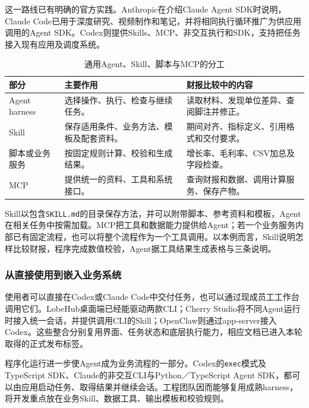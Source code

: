 这一路线已有明确的官方实践。Anthropic在介绍Claude Agent SDK时说明，Claude Code已用于深度研究、视频制作和笔记，并将相同执行循环推广为供应用调用的Agent SDK。Codex则提供Skills、MCP、非交互执行和SDK，支持把任务接入现有应用及调度系统。

\begin{table}[H]\small\centering
\caption{通用Agent、Skill、脚本与MCP的分工}\label{tab:skills-mcp}
\begin{tabularx}{\linewidth}{@{}P{28mm}Y Y@{}}\toprule
部分 & 主要作用 & 财报比较中的内容\\\midrule
Agent harness & 选择操作、执行、检查与继续任务。 & 读取材料、发现单位差异、查阅脚注并修正。\\
Skill & 保存适用条件、业务方法、模板及配套资料。 & 期间对齐、指标定义、引用格式和交付要求。\\
脚本或业务服务 & 按固定规则计算、校验和生成结果。 & 增长率、毛利率、CSV加总及字段检查。\\
MCP & 提供统一的资料、工具和系统接口。 & 查询财报和数据、调用计算服务、保存产物。\\\bottomrule
\end{tabularx}
\end{table}

Skill以包含\texttt{SKILL.md}的目录保存方法，并可以附带脚本、参考资料和模板，Agent在相关任务中按需加载。MCP把工具和数据能力提供给Agent；若一个业务服务内部已有固定流程，也可以将整个流程作为一个工具调用。以本例而言，Skill说明怎样比较财报，程序完成数值校验，Agent据工具结果生成表格与三条说明。

\subsubsection{从直接使用到嵌入业务系统}
使用者可以直接在Codex或Claude Code中交付任务，也可以通过现成员工工作台调用它们。LobeHub桌面端已经能驱动两款CLI；Cherry Studio将不同Agent运行时接入统一会话，并提供调用CLI的Skill；OpenClaw则通过app-server接入Codex。这些整合分别复用界面、任务状态和底层执行能力，相应文档已进入本轮取得的正式发布标签。

程序化运行进一步使Agent成为业务流程的一部分。Codex的\texttt{exec}模式及TypeScript SDK、Claude的非交互CLI与Python／TypeScript Agent SDK，都可以由应用启动任务、取得结果并继续会话。工程团队因而能够复用成熟harness，将开发重点放在业务Skill、数据工具、输出模板和校验规则。

